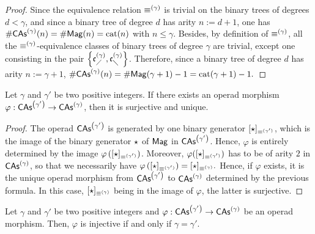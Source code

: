 \begin{proof}
    Since the equivalence relation $\operatorname{\equiv}^{(\gamma)}$ is trivial on the
    binary trees of degrees $d < \gamma$, and since a binary tree of
    degree $d$ has arity $n := d + 1$, one has
    $\# \mathsf{CAs}^{\left(\gamma\right)}(n) = \# \mathsf{Mag}(n) = \mathrm{cat}(n)$ with $n \leq \gamma$.
    Besides, by definition of $\operatorname{\equiv}^{(\gamma)}$, all the
    $\operatorname{\equiv}^{(\gamma)}$-equivalence classes of binary trees of degree
    $\gamma$ are trivial, except one consisting in the pair
    $\left\{\mathfrak{c}^{\left(\gamma\right)}_{\diagup}, \mathfrak{c}^{\left(\gamma\right)}_{\diagdown}\right\}$. Therefore, since a
    binary tree of degree $d$ has arity $n := \gamma + 1$,
    \begin{math}
        \# \mathsf{CAs}^{\left(\gamma\right)}(n)
        = \# \mathsf{Mag}(\gamma + 1) - 1
        = \mathrm{cat}(\gamma + 1) - 1.
    \end{math}
\end{proof}
\medbreak

\begin{Lemma} \label{lem:surjective_morphisms_CAs}
    Let $\gamma$ and $\gamma'$ be two positive integers. If there exists
    an operad morphism $\varphi:\mathsf{CAs}^{\left(\gamma'\right)} \to \mathsf{CAs}^{\left(\gamma\right)}$, then it
    is surjective and unique.
\end{Lemma}

\begin{proof}
    The operad $\mathsf{CAs}^{\left(\gamma'\right)}$ is generated by one binary generator
    $[\operatorname{\star}]_{\operatorname{\equiv}^{(\gamma')}}$, which is the image of the binary
    generator $\operatorname{\star}$ of $\mathsf{Mag}$ in $\mathsf{CAs}^{\left(\gamma'\right)}$. Hence, $\varphi$
    is entirely determined by the image
    $\varphi\left([\operatorname{\star}]_{\operatorname{\equiv}^{(\gamma')}}\right)$. Moreover,
    $\varphi([\operatorname{\star}]_{\operatorname{\equiv}^{(\gamma')}})$ has to be of arity $2$ in
    $\mathsf{CAs}^{\left(\gamma\right)}$, so that we necessarily have
    \begin{math}
        \varphi\left([\operatorname{\star}]_{\operatorname{\equiv}^{(\gamma')}}\right)
        =
        [\operatorname{\star}]_{\operatorname{\equiv}^{(\gamma)}}.
    \end{math}
    Hence, if $\varphi$ exists, it is the unique operad morphism from
    $\mathsf{CAs}^{\left(\gamma'\right)}$ to $\mathsf{CAs}^{\left(\gamma\right)}$ determined by the previous formula.
    In this case, $[\operatorname{\star}]_{\operatorname{\equiv}^{(\gamma)}}$ being in the image of
    $\varphi$, the latter is surjective.
\end{proof}
\medbreak

\begin{Lemma} \label{lem:injective_morphisms_CAs}
    Let $\gamma$ and $\gamma'$ be two positive integers and
    $\varphi:\mathsf{CAs}^{\left(\gamma'\right)} \to \mathsf{CAs}^{\left(\gamma\right)}$ be an operad morphism.
    Then, $\varphi$ is injective if and only if $\gamma = \gamma'$.
\end{Lemma}

